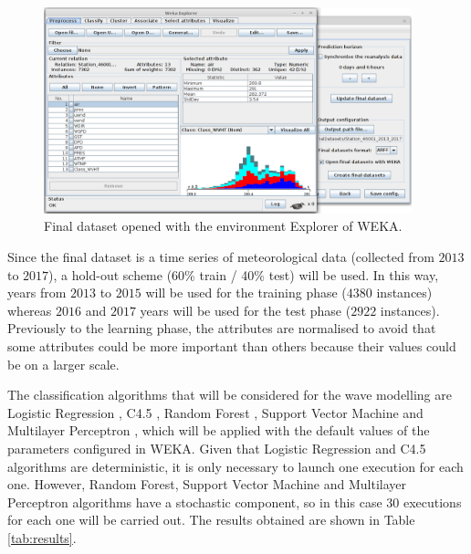 \documentclass[energies,article,submit,moreauthors,pdftex]{Definitions/mdpi}
\begin{document}
			\begin{figure}[ht!]
				\centering
				\includegraphics[width=0.95\textwidth]{figures/FigureOpeningFinalDatasetWeka.png}
				\caption{Final dataset opened with the environment Explorer of WEKA.}
				\label{fig:openigFinalDatasetWeka}
			\end{figure}
			
			Since the final dataset is a time series of meteorological data (collected from $2013$ to $2017$), a hold-out scheme (60\% train / 40\% test) will be used. In this way, years from $2013$ to $2015$ will be used for the training phase ($4380$ instances) whereas $2016$ and $2017$ years will be used for the test phase ($2922$ instances). Previously to the learning phase, the attributes are normalised to avoid that some attributes could be more important than others because their values could be on a larger scale.
			
			The classification algorithms that will be considered for the wave modelling are Logistic Regression \cite{hosmer2013applied}, C4.5 \cite{quinlan2014c4}, Random Forest \cite{breiman2001random}, Support Vector Machine \cite{cortes1995support} and Multilayer Perceptron \cite{haykin1994neural}, which will be applied with the default values of the parameters configured in WEKA. Given that Logistic Regression and C4.5 algorithms are deterministic, it is only necessary to launch one execution for each one. However, Random Forest, Support Vector Machine and Multilayer Perceptron algorithms have a stochastic component, so in this case 30 executions for each one will be carried out. The results obtained are shown in Table \ref{tab:results}.
			
\end{document}
